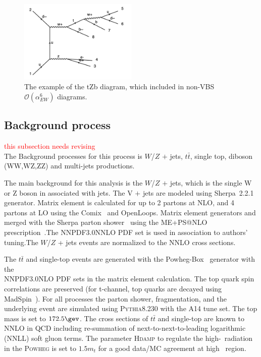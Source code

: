 \begin{figure}[tbp]
\begin{center}
\includegraphics[width=0.5\textwidth,keepaspectratio]{figures/samples/feynEWKnonVBStZb.pdf}
\caption{
The example of the tZb diagram, which included in non-VBS $\mathcal{O}(\alpha_{EW}^6)$ diagrams.
}
\label{fig:feynmantZb}
\end{center}
\end{figure}

\subsection{Background process}

\textcolor{red}{this subsection needs revising} \\
The Background processes for this process is  $W$/$Z$ $\plus$ jets, $t\bar{t}$, single top, diboson (WW,WZ,ZZ) and multi-jets productions. 

The main background for this analysis is the  $W$/$Z$ $\plus$ jets, which is the single W or Z boson in associated with jets. The V $\plus$ jets are modeled using Sherpa~2.2.1~\cite{Gleisberg:2008ta} generator. Matrix element is calculated for up to 2 partons at NLO, and 4 partons at LO using the Comix~\cite{Gleisberg:2008fv} and OpenLoops\cite{Cascioli:2011va}. Matrix element generators and merged with the Sherpa parton shower~\cite{Schumann:2007mg} using the ME+PS@NLO prescription~\cite{Hoeche:2012yf}.The NNPDF3.0NNLO PDF set is used in association to authors' tuning.The $W$/$Z$ + jets events are normalized to the NNLO cross sections.

The $t\bar{t}$ and single-top events are generated with the Powheg-Box~\cite{Alioli:2010xd} generator with the \\
NNPDF3.0NLO PDF\cite{Ball:2014uwa} sets in the matrix element calculation.
The top quark spin correlations are preserved (for t-channel, top quarks are decayed using MadSpin~\cite{Artoisenet:2012st}).
For all processes the parton shower, fragmentation, and the underlying event are simulated using \textsc{Pythia}8.230 with the A14 tune set\cite{ATL-PHYS-PUB-2014-021}.
The top mass is set to $172.5\gev$.
The cross sections of $t\bar{t}$ and single-top are known to NNLO in QCD including re-summation of next-to-next-to-leading logarithmic (NNLL) soft gluon terms\cite{Czakon:2011xx,Kidonakis:2011wy,Kidonakis:2010tc,Kidonakis:2010ux}.
The parameter \textsc{Hdamp} to regulate the high-\pt\ radiation in the \textsc{Powheg} is set to $1.5m_{t}$ for a good data/MC agreement at high \pt\ region\cite{ATL-PHYS-PUB-2016-020}.


